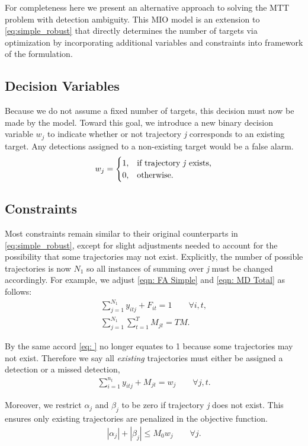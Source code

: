For completeness here we present an alternative approach to solving the MTT problem with detection ambiguity. This MIO model is an extension to \eqref{eq:simple_robust} that directly determines the number of targets via optimization by incorporating additional variables and constraints into framework of the formulation. 

\subsection{Decision Variables}
Because we do not assume a fixed number of targets, this decision must now be made by the model. Toward this goal, we introduce a new binary decision variable $w_{j}$ to indicate whether or not trajectory \textit{j} corresponds to an existing target. Any detections assigned to a non-existing target would be a false alarm. 
\[w_{j} = 
\begin{cases}
1, & \text{if trajectory \textit{j} exists,}\\
0, & \text{otherwise.}
\end{cases}\]

\subsection{Constraints}
Most constraints remain similar to their original counterparts in \eqref{eq:simple_robust}, except for slight adjustments needed to account for the possibility that some trajectories may not exist. Explicitly, the number of possible trajectories is now $N_{1}$ so all instances of summing over \textit{j} must be changed accordingly. For example, we adjust \eqref{eqn: FA Simple} and \eqref{eqn: MD Total} as follows: 
\begin{align*}
\sum_{j=1}^{N_{1}} y_{itj} + F_{it} = 1 \qquad \forall i,t,\\
\sum_{j=1}^{N_{1}} \sum_{t=1}^{T} M_{jt} = TM.
\end{align*}

By the same accord \eqref{eq: } no longer equates to 1 because some trajectories may not exist. Therefore we say all \textit{existing} trajectories must either be assigned a detection or a missed detection,
\begin{align}\label{eqn: Existing Targets}
\sum_{i=1}^{n_{t}} y_{itj} + M_{jt} = w_{j} \qquad \forall j,t.
\end{align}

Moreover, we restrict $\alpha_{j}$ and $\beta_{j}$ to be zero if trajectory \textit{j} does not exist. This ensures only existing trajectories are penalized in the objective function. 
\begin{align*}
|\alpha_{j}|+|\beta_{j}| \leq M_{0}w_{j}\qquad \forall j.
\end{align*}

